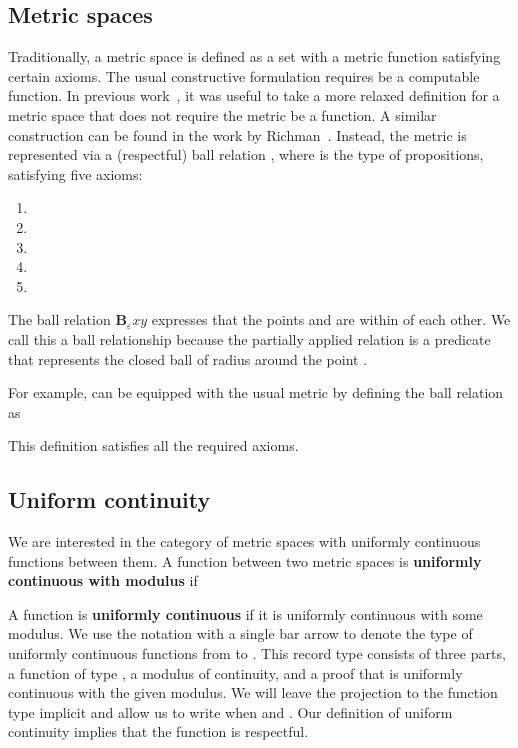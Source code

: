 \documentclass{elsarticle}
\newcommand{\tmdfn}[1]{\textbf{#1}}
\newcommand{\tmmathbf}[1]{\ensuremath{\boldsymbol{#1}}}
\newcommand{\ballsym}{\ensuremath{\tmmathbf{B}}}
\newcommand{\ball}[4]{\ensuremath{\ballsym^{#1}_{#2}  #3  #4}}
\begin{document}
\subsection{Metric spaces}\label{ss:MS}Traditionally, a metric space is
defined as a set  with a metric function  satisfying certain axioms. The usual constructive
formulation requires  be a computable function. In previous
work~{\cite{OConnor:mscs}}, it was useful to take a more relaxed definition
for a metric space that does not require the metric be a function. A similar
construction can be found in the work by Richman~{\cite{Richman:2008}}.
Instead, the metric is represented via a (respectful) ball relation , where 
is the type of propositions, satisfying five axioms:
\begin{enumerate}
  \item 
  
  \item 
  
  \item 
  
  \item 
  
  \item 
\end{enumerate}
The ball relation {\ball{}{{\varepsilon}}{x}{y}} expresses that the points 
and  are within  of each other. We call this a ball
relationship because the partially applied relation  is a predicate that represents the closed ball of
radius  around the point .

For example,  can be equipped with the usual metric by defining
the ball relation as

This definition satisfies all the required axioms.

\subsection{Uniform continuity}We are interested in the category of metric
spaces with uniformly continuous functions between them. A function  between two metric spaces is {\tmdfn{uniformly continuous with
modulus}}  if



A function is {\tmdfn{uniformly continuous}} if it is uniformly continuous
with some modulus. We use the notation  with a single bar
arrow to denote the type of uniformly continuous functions from  to .
This record type consists of three parts, a function  of type , a modulus of continuity, and a proof that  is uniformly
continuous with the given modulus. We will leave the projection to the
function type implicit and allow us to write  when 
and . Our definition of uniform continuity implies that the function is
respectful.
\end{document}
